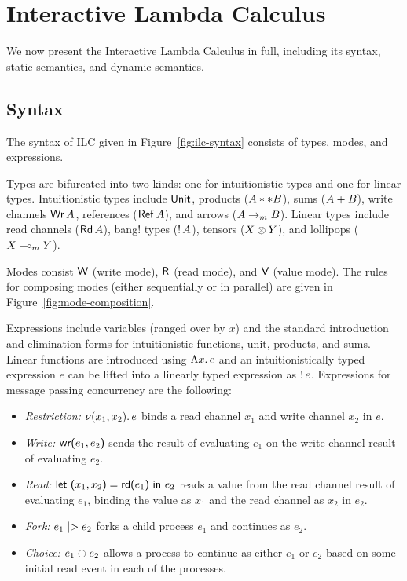 \section{Interactive Lambda Calculus}
\label{sec:ilc}

We now present the Interactive Lambda Calculus in full, including its syntax,
static semantics, and dynamic semantics.

\subsection{Syntax}
\label{subsec:syntax}



The syntax of ILC given in Figure~\ref{fig:ilc-syntax} consists of types, modes,
and expressions.

Types are bifurcated into two kinds: one for intuitionistic types and one for
linear types. Intuitionistic types include $\text{\textsf{Unit}}$, products
(${A} ** {B}$), sums (${A} + {B}$), write channels $\text{\textsf{Wr}}\,A$, references
($\text{\textsf{Ref}}\,A$), and arrows (${A}\rightarrow_{\footnotesize m}{B}$). Linear types
include read channels ($\text{\textsf{Rd}}\,A$), bang! types (${!}\,{A}$), tensors
(${X}\otimes{Y}$), and lollipops (${X}\multimap_{\footnotesize m}{Y}$).

Modes consist $\textsf{W}$ (write mode), $\textsf{R}$ (read mode), and $\textsf{V}$ (value mode). The
rules for composing modes (either sequentially or in parallel) are given in
Figure~\ref{fig:mode-composition}.

Expressions include variables (ranged over by $x$) and the standard introduction
and elimination forms for intuitionistic functions, unit, products, and
sums.  Linear functions are introduced using
$\Lambda{x}.\,{e}$ and an intuitionistically typed expression $e$ can be lifted into
a linearly typed expression as ${!}\,{e}$. 
Expressions for message passing concurrency are the following:
\begin{itemize}[leftmargin=*]
  \item \emph{Restriction:} $\nu(x_1, x_2).\,e$ binds a read channel $x_1$ and
    write channel $x_2$ in $e$.
  \item \emph{Write:} $\text{\textsf{wr}}\textsf{(}{e_1},{e_2}\textsf{)}$ sends the result of evaluating $e_1$ on
    the write channel result of evaluating $e_2$.
  \item \emph{Read:} $\text{\textsf{let}}\ {\textsf{(}{x_1},{x_2}\textsf{)}} = {\text{\textsf{rd}}\textsf{(}{e_1}\textsf{)}}\ \text{\textsf{in}}\ {{e_2}}$ reads a value from the read
    channel result of evaluating $e_1$, binding the value as $x_1$ and the read
    channel as $x_2$ in $e_2$.
  \item \emph{Fork:} $e_1 \mathrel{|\rhd} e_2$ forks a child process $e_1$ and
    continues as $e_2$.
  \item \emph{Choice:} $e_1 \mathrel{\oplus} e_2$ allows a process to continue as
    either $e_1$ or $e_2$ based on some initial read event in each of the
    processes.
\end{itemize}

